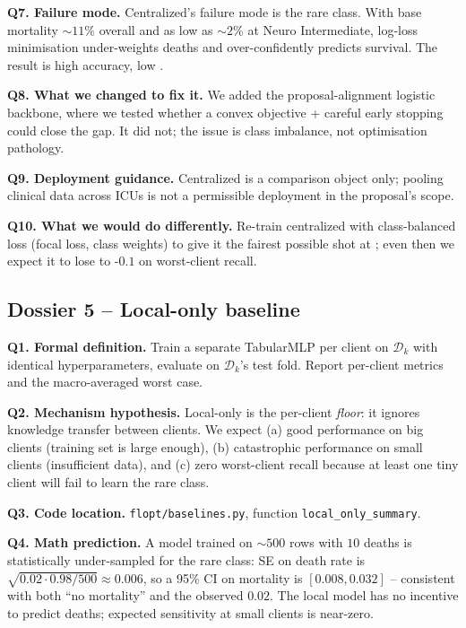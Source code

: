 \textbf{Q7. Failure mode.}
Centralized's failure mode is the rare class. With base mortality
$\sim$$11\%$ overall and as low as $\sim$$2\%$ at Neuro Intermediate,
log-loss minimisation under-weights deaths and over-confidently
predicts survival. The result is high accuracy, low \auprc{}.

\textbf{Q8. What we changed to fix it.}
We added the proposal-alignment logistic backbone, where we tested
whether a convex objective + careful early stopping could close the
\auprc{} gap. It did not; the issue is class imbalance, not
optimisation pathology.

\textbf{Q9. Deployment guidance.}
Centralized is a comparison object only; pooling clinical data across
ICUs is not a permissible deployment in the proposal's scope.

\textbf{Q10. What we would do differently.}
Re-train centralized with class-balanced loss (focal loss,
class weights) to give it the fairest possible shot at \auprc{}; even
then we expect it to lose to \fedprox{}-$0.1$ on worst-client recall.

\subsection{Dossier 5 -- Local-only baseline}
\label{sec:dossier-local}

\textbf{Q1. Formal definition.}
Train a separate TabularMLP per client on $\mathcal{D}_k$ with
identical hyperparameters, evaluate on $\mathcal{D}_k$'s test fold.
Report per-client metrics and the macro-averaged worst case.

\textbf{Q2. Mechanism hypothesis.}
Local-only is the per-client \emph{floor}: it ignores knowledge
transfer between clients. We expect (a) good performance on big
clients (training set is large enough), (b) catastrophic performance
on small clients (insufficient data), and (c) zero worst-client recall
because at least one tiny client will fail to learn the rare class.

\textbf{Q3. Code location.}
\texttt{flopt/baselines.py}, function \texttt{local\_only\_summary}.

\textbf{Q4. Math prediction.}
A model trained on $\sim$$500$ rows with $10$ deaths is statistically
under-sampled for the rare class: SE on death rate is
$\sqrt{0.02 \cdot 0.98 / 500} \!\approx\! 0.006$, so a 95\% CI on
mortality is $[0.008, 0.032]$ -- consistent with both ``no
mortality'' and the observed $0.02$. The local model has no incentive
to predict deaths; expected sensitivity at small clients is
near-zero.

